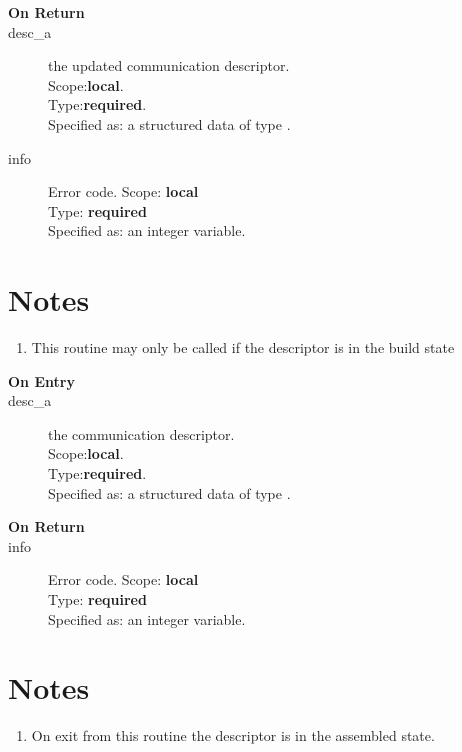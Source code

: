 \begin{description}
\item[\bf On Return]
\item[desc\_a] the updated communication descriptor.\\
Scope:{\bf local}.\\
Type:{\bf required}.\\
Specified as: a structured data of type \descdata.
\item[info] Error code.
Scope: {\bf local} \\
Type: {\bf required}\\
Specified as: an integer variable.
\end{description}
\section*{Notes}
\begin{enumerate}
\item This routine may only be called if the descriptor is in the
  build state
\end{enumerate}



%
%


\begin{description}
\item[\bf On Entry]
\item[desc\_a] the communication descriptor.\\
Scope:{\bf local}.\\
Type:{\bf required}.\\
Specified as: a structured data of type \descdata.
\end{description}

\begin{description}
\item[\bf On Return]
\item[info] Error code.
Scope: {\bf local} \\
Type: {\bf required}\\
Specified as: an integer variable.
\end{description}
\section*{Notes}
\begin{enumerate}
\item On exit from this routine the descriptor is in the assembled
  state. 
\end{enumerate}



